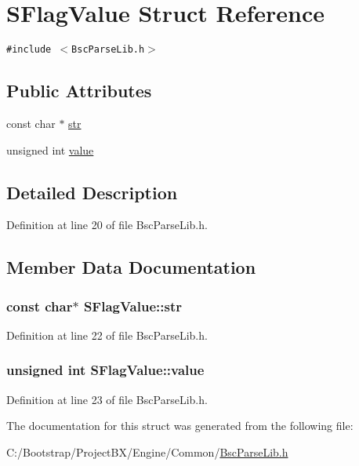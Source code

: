 \hypertarget{struct_s_flag_value}{
\section{SFlagValue Struct Reference}
\label{struct_s_flag_value}
}
{\tt \#include $<$BscParseLib.h$>$}

\subsection*{Public Attributes}
\begin{CompactItemize}
\item 
const char $\ast$ \hyperlink{struct_s_flag_value_a6eb69d299162122720206fdf3dbedd8}{str}
\item 
unsigned int \hyperlink{struct_s_flag_value_715ef60268d48a7fae29f7a8a1b59d74}{value}
\end{CompactItemize}


\subsection{Detailed Description}


Definition at line 20 of file BscParseLib.h.

\subsection{Member Data Documentation}
\hypertarget{struct_s_flag_value_a6eb69d299162122720206fdf3dbedd8}{
\subsubsection[{str}]{\setlength{\rightskip}{0pt plus 5cm}const char$\ast$ {\bf SFlagValue::str}}}
\label{struct_s_flag_value_a6eb69d299162122720206fdf3dbedd8}




Definition at line 22 of file BscParseLib.h.\hypertarget{struct_s_flag_value_715ef60268d48a7fae29f7a8a1b59d74}{
\subsubsection[{value}]{\setlength{\rightskip}{0pt plus 5cm}unsigned int {\bf SFlagValue::value}}}
\label{struct_s_flag_value_715ef60268d48a7fae29f7a8a1b59d74}




Definition at line 23 of file BscParseLib.h.

The documentation for this struct was generated from the following file:\begin{CompactItemize}
\item 
C:/Bootstrap/ProjectBX/Engine/Common/\hyperlink{_bsc_parse_lib_8h}{BscParseLib.h}\end{CompactItemize}

